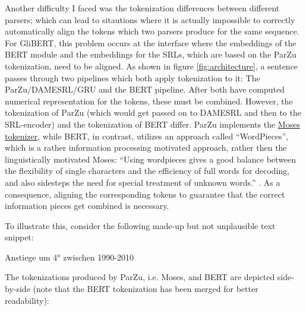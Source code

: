 Another difficulty I faced was the tokenization differences between different parsers; which can
lead to sitautions where it is actually impossible to correctly automatically align the tokens
which two parsers produce for the same sequence.
For GliBERT, this problem occurs at the interface where the embeddings of the BERT
module and the embeddings for the SRLs, which are based on the ParZu tokenization,
need to be aligned. As shown in figure \ref{fig:architecture}, a sentence passes
through two pipelines which both apply tokenization to it: The ParZu/DAMESRL/GRU
and the BERT pipeline. After both have computed numerical representation for the
tokens, these must be combined. However, the tokenization of ParZu (which would
get passed on to DAMESRL and then to the SRL-encoder) and the tokenization of BERT
differ. ParZu implements the \href{http://www.statmt.org/moses/}{Moses tokenizer},
while BERT, in contrast, utilizes an approach called ``WordPieces'', which is a
rather information processing motivated approach, rather then the linguistically
motivated Moses: ``Using wordpieces gives a good balance between the flexibility of
single characters and the efficiency of full words for decoding, and also sidesteps
the need for special treatment of unknown words.'' \citep[p.~2]{wu2016google}. As
a consequence, aligning the corresponding tokens to guarantee that the correct
information pieces get combined is necessary.

To illustrate this, consider the following made-up but not unplausible text snippet:

\begin{examples}
	\item \label{itm:tok-sentence} Anstiege um 4° zwischen 1990-2010
\end{examples}

The tokenizations produced by ParZu, i.e. Moses, and BERT are
depicted side-by-side (note that the BERT tokenization has been
merged for better readability):

